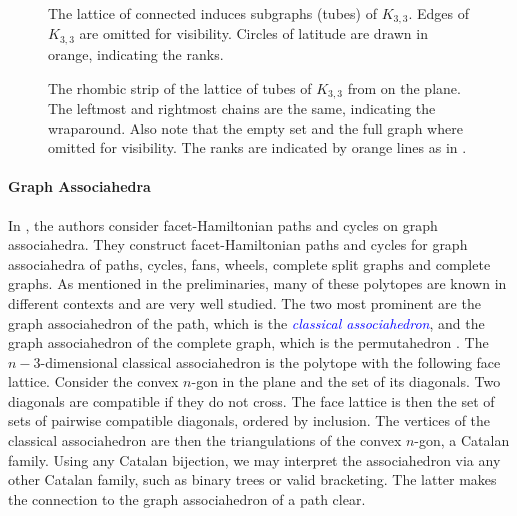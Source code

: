 \documentclass[fontsize=11pt,a4paper,DIV=12]{scrartcl}
\newcommand{\defn}[1]{\textsl{\textcolor{Blue}{#1}}}
\begin{document}
\begin{figure}
    \centering
    
    \caption{The lattice of connected induces subgraphs (tubes) of $K_{3,3}$. Edges of $K_{3,3}$ are omitted for visibility. Circles of latitude are drawn in orange, indicating the ranks.}
    \label{fig:K33 on sphere}
\end{figure}

\begin{figure}
    \centering
    \makebox[\textwidth][c]{}
    \caption{The rhombic strip of the lattice of tubes of $K_{3,3}$ from  on the plane. The leftmost and rightmost chains are the same, indicating the wraparound. Also note that the empty set and the full graph where omitted for visibility. The ranks are indicated by orange lines as in .}
    \label{fig:K33 on plane}
\end{figure}

\paragraph{Graph Associahedra}
In \cite{facethamiltonicity}, the authors consider facet-Hamiltonian paths and cycles on graph associahedra. They construct facet-Hamiltonian paths and cycles for graph associahedra of paths, cycles, fans, wheels, complete split graphs and complete graphs. As mentioned in the preliminaries, many of these polytopes are known in different contexts and are very well studied. The two most prominent are the graph associahedron of the path, which is the \defn{classical associahedron}, and the graph associahedron of the complete graph, which is the permutahedron \cite{Associahedron, Associahedra_spines, Associahedra_diameter, Associahedron_realizations, Associahedron_non_leaving_face}. The $n-3$-dimensional classical associahedron is the polytope with the following face lattice. Consider the convex $n$-gon in the plane and the set of its diagonals. Two diagonals are compatible if they do not cross. The face lattice is then the set of sets of pairwise compatible diagonals, ordered by inclusion. The vertices of the classical associahedron are then the triangulations of the convex $n$-gon, a Catalan family. Using any Catalan bijection, we may interpret the associahedron via any other Catalan family, such as binary trees or valid bracketing. The latter makes the connection to the graph associahedron of a path clear.
\end{document}
